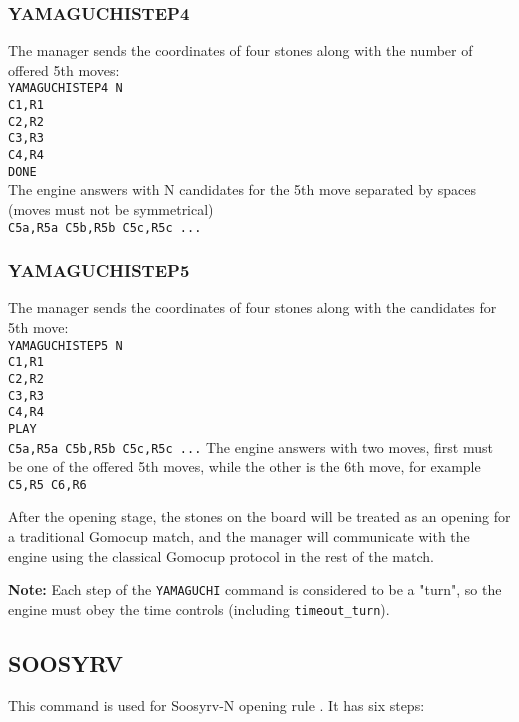\documentclass[12pt,a4paper]{article}
\begin{document}
\subsubsection{YAMAGUCHISTEP4}
The manager sends the coordinates of four stones along with the number of offered 5th moves:\\
\texttt{YAMAGUCHISTEP4 N}\\
\texttt{C1,R1}\\
\texttt{C2,R2}\\
\texttt{C3,R3}\\
\texttt{C4,R4}\\
\texttt{DONE}\\
The engine answers with N candidates for the 5th move separated by spaces (moves must not be symmetrical)\\
\texttt{C5a,R5a C5b,R5b C5c,R5c ...}

\subsubsection{YAMAGUCHISTEP5}
The manager sends the coordinates of four stones along with the candidates for 5th move:\\
\texttt{YAMAGUCHISTEP5 N}\\
\texttt{C1,R1}\\
\texttt{C2,R2}\\
\texttt{C3,R3}\\
\texttt{C4,R4}\\
\texttt{PLAY}\\
\texttt{C5a,R5a C5b,R5b C5c,R5c ...}
The engine answers with two moves, first must be one of the offered 5th moves, while the other is the 6th move, for example\\
\texttt{C5,R5 C6,R6}

After the opening stage, the stones on the board will be treated as an opening for a traditional Gomocup match, and the manager will communicate with the engine using the classical Gomocup protocol in the rest of the match.

\textbf{Note:} Each step of the \texttt{YAMAGUCHI} command is considered to be a "turn", so the engine must obey the time controls (including \texttt{timeout{\_}turn}).


\subsection{SOOSYRV}
\label{cmd_soosyrv}
This command is used for Soosyrv-N opening rule \cite{renju_opening_rules}. It has six steps:
\end{document}

